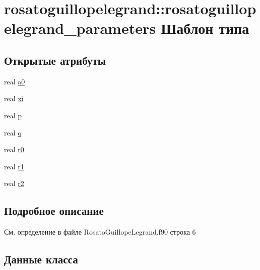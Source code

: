 \hypertarget{structrosatoguillopelegrand_1_1rosatoguillopelegrand__parameters}{}\section{rosatoguillopelegrand\+:\+:rosatoguillopelegrand\+\_\+parameters Шаблон типа}
\label{structrosatoguillopelegrand_1_1rosatoguillopelegrand__parameters}
\subsection*{Открытые атрибуты}
\begin{DoxyCompactItemize}
\item 
real \mbox{\hyperlink{structrosatoguillopelegrand_1_1rosatoguillopelegrand__parameters_affd8ef62c484c094ad39e1a99b543a46}{a0}}
\item 
real \mbox{\hyperlink{structrosatoguillopelegrand_1_1rosatoguillopelegrand__parameters_a4da801c40a5bb7d671781816b584aa2e}{xi}}
\item 
real \mbox{\hyperlink{structrosatoguillopelegrand_1_1rosatoguillopelegrand__parameters_ab84e45c30d20ade3be2e7dd9025fe175}{p}}
\item 
real \mbox{\hyperlink{structrosatoguillopelegrand_1_1rosatoguillopelegrand__parameters_a114045f304c60356d1dd8273df231a58}{q}}
\item 
real \mbox{\hyperlink{structrosatoguillopelegrand_1_1rosatoguillopelegrand__parameters_aa9c20e7913556c3bb676ef6491ef1883}{r0}}
\item 
real \mbox{\hyperlink{structrosatoguillopelegrand_1_1rosatoguillopelegrand__parameters_ac56ed89a0e41e5a81b0fa2e77aa8d966}{r1}}
\item 
real \mbox{\hyperlink{structrosatoguillopelegrand_1_1rosatoguillopelegrand__parameters_a8d13bf015f20a52edbb6f0f7c8609272}{r2}}
\end{DoxyCompactItemize}


\subsection{Подробное описание}


См. определение в файле Rosato\+Guillope\+Legrand.\+f90 строка 6



\subsection{Данные класса}
\mbox{\label{structrosatoguillopelegrand_1_1rosatoguillopelegrand__parameters_affd8ef62c484c094ad39e1a99b543a46}} 
